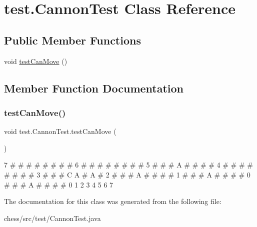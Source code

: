 \hypertarget{classtest_1_1_cannon_test}{}\section{test.\+Cannon\+Test Class Reference}
\label{classtest_1_1_cannon_test}
\subsection*{Public Member Functions}
\begin{DoxyCompactItemize}
\item 
void \mbox{\hyperlink{classtest_1_1_cannon_test_a219a6aeeddb9395ed8e3a990819d00a2}{test\+Can\+Move}} ()
\end{DoxyCompactItemize}


\subsection{Member Function Documentation}
\mbox{\label{classtest_1_1_cannon_test_a219a6aeeddb9395ed8e3a990819d00a2}} 
\subsubsection{\texorpdfstring{testCanMove()}{testCanMove()}}
{\footnotesize\ttfamily void test.\+Cannon\+Test.\+test\+Can\+Move (\begin{DoxyParamCaption}{ }\end{DoxyParamCaption})\hspace{0.3cm}{\ttfamily [inline]}}

7 \# \# \# \# \# \# \# \# 6 \# \# \# \# \# \# \# \# 5 \# \# \# A \# \# \# \# 4 \# \# \# \# \# \# \# \# 3 \# \# \# C A \# A \# 2 \# \# \# A \# \# \# \# 1 \# \# \# A \# \# \# \# 0 \# \# \# A \# \# \# \# 0 1 2 3 4 5 6 7

The documentation for this class was generated from the following file\+:\begin{DoxyCompactItemize}
\item 
chess/src/test/Cannon\+Test.\+java\end{DoxyCompactItemize}
